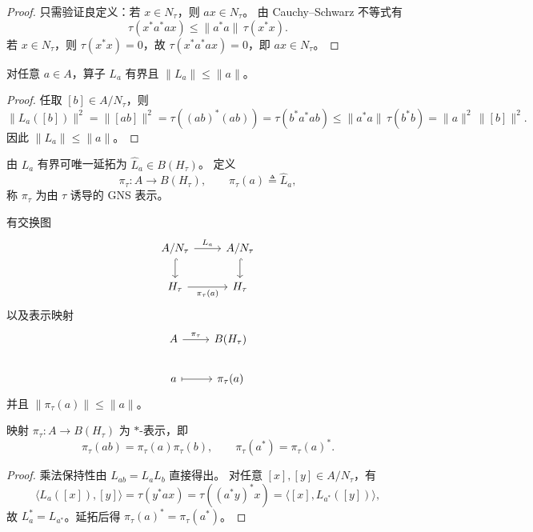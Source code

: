 \documentclass[lang=cn,a4paper,newtx,section]{elegantbook}
\begin{document}
\begin{proof}
  只需验证良定义：若 $x\in N_{\tau}$，则 $ax\in N_{\tau}$。
  由 Cauchy--Schwarz 不等式有
  \[
    \tau(x^{*}a^{*}ax)\le \|a^{*}a\|\,\tau(x^{*}x).
  \]
  若 $x\in N_{\tau}$，则 $\tau(x^{*}x)=0$，故 $\tau(x^{*}a^{*}ax)=0$，即 $ax\in N_{\tau}$。
\end{proof}

\begin{proposition}
  对任意 $a\in A$，算子 $L_{a}$ 有界且 $\|L_{a}\|\le\|a\|$。
\end{proposition}

\begin{proof}
  任取 $[b]\in A/N_{\tau}$，则
  \[
    \|L_{a}([b])\|^{2}=\|[ab]\|^{2}=\tau((ab)^{*}(ab))=\tau(b^{*}a^{*}ab)
    \le \|a^{*}a\|\,\tau(b^{*}b)=\|a\|^{2}\,\|[b]\|^{2}.
  \]
  因此 $\|L_{a}\|\le\|a\|$。
\end{proof}

\begin{definition}
  由 $L_{a}$ 有界可唯一延拓为 $\widehat{L}_{a}\in B(H_{\tau})$。
  定义
  \[
    \pi_{\tau}:A\to B(H_{\tau}),\qquad \pi_{\tau}(a)\triangleq\widehat{L}_{a},
  \]
  称 $\pi_{\tau}$ 为由 $\tau$ 诱导的 GNS 表示。
\end{definition}

\begin{remark}
  有交换图
  \[
    \begin{tikzcd}
      A/N_{\tau} \arrow[r, "L_{a}"] \arrow[d, hook] & A/N_{\tau} \arrow[d, hook] \\
      H_{\tau} \arrow[r, "\pi_{\tau}(a)"'] & H_{\tau}
    \end{tikzcd}
  \]
  以及表示映射
  \[
    \begin{tikzcd}
      A \arrow[r, "\pi_{\tau}"] & B(H_{\tau}) \\
      a \arrow[r, mapsto] & \pi_{\tau}(a)
    \end{tikzcd}
  \]
  并且 $\|\pi_{\tau}(a)\|\le\|a\|$。
\end{remark}

\begin{proposition}
  映射 $\pi_{\tau}:A\to B(H_{\tau})$ 为 $*$-表示，即
  \[
    \pi_{\tau}(ab)=\pi_{\tau}(a)\pi_{\tau}(b),\qquad \pi_{\tau}(a^{*})=\pi_{\tau}(a)^{*}.
  \]
\end{proposition}

\begin{proof}
  乘法保持性由 $L_{ab}=L_{a}L_{b}$ 直接得出。
  对任意 $[x],[y]\in A/N_{\tau}$，有
  \[
    \langle L_{a}([x]),[y]\rangle=\tau(y^{*}ax)=\tau((a^{*}y)^{*}x)=\langle[x],L_{a^{*}}([y])\rangle,
  \]
  故 $L_{a}^{*}=L_{a^{*}}$。延拓后得 $\pi_{\tau}(a)^{*}=\pi_{\tau}(a^{*})$。
\end{proof}
\end{document}
